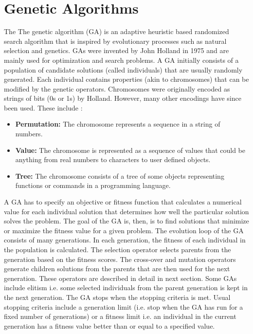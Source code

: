 %
%
%
\chapter{Genetic Algorithms}\label{ch:ga}
    The The genetic algorithm (GA) is an adaptive heuristic based randomized search algorithm that is inspired by evolutionary processes such as natural selection and genetics. GAs were invented by John Holland in 1975 and are mainly used for optimization and search problems. A GA initially consists of a population of candidate solutions (called individuals) that are usually randomly generated. Each individual contains properties (akin to chromosomes) that can be modified by the genetic operators. Chromosomes were originally encoded as strings of bits (0s or 1s) by Holland. However, many other encodings have since been used. These include : 
\begin{itemize}
        \item []{\bf Permutation:} The chromosome represents a sequence in a string of numbers.
        \item []{\bf Value:} The chromosome is represented as a sequence of values that could be anything from real numbers to characters to user defined objects.
        \item []{\bf Tree:} The chromosome consists of a tree of some objects representing functions or commands in a programming language.\cite{}
\end{itemize}
    
    A GA has to specify an objective or fitness function that calculates a numerical value for each individual solution that determines how well the particular solution solves the problem. The goal of the GA is, then, is to find solutions that minimize or maximize the fitness value for a given problem. The evolution loop of the GA consists of many generations. In each generation, the fitness of each individual in the population is calculated. The selection operator selects parents from the generation based on the fitness scores. The cross-over and mutation operators generate children solutions from the parents that are then used for the next generation. These operators are described in detail in next section. Some GAs include elitism i.e. some selected individuals from the parent generation is kept in the next generation. The GA stops when the stopping criteria is met. Usual stopping criteria include a generation limit (i.e. stop when the GA has run for a fixed number of generations) or a fitness limit i.e. an individual in the current generation has a fitness value better than or equal to a specified value. 
    
